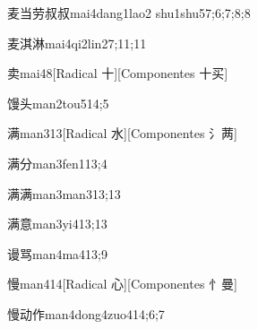 \begin{verbete}{麦当劳叔叔}{mai4dang1lao2 shu1shu5}{7;6;7;8;8}
\end{verbete}

\begin{verbete}{麦淇淋}{mai4qi2lin2}{7;11;11}
\end{verbete}

\begin{verbete}{卖}{mai4}{8}[Radical 十][Componentes 十买]
\end{verbete}

\begin{verbete}{馒头}{man2tou5}{14;5}
\end{verbete}

\begin{verbete}{满}{man3}{13}[Radical 水][Componentes 氵𬜯]
\end{verbete}

\begin{verbete}{满分}{man3fen1}{13;4}
\end{verbete}

\begin{verbete}{满满}{man3man3}{13;13}
\end{verbete}

\begin{verbete}{满意}{man3yi4}{13;13}
\end{verbete}

\begin{verbete}{谩骂}{man4ma4}{13;9}
\end{verbete}

\begin{verbete}{慢}{man4}{14}[Radical 心][Componentes 忄曼]
\end{verbete}

\begin{verbete}{慢动作}{man4dong4zuo4}{14;6;7}
\end{verbete}

